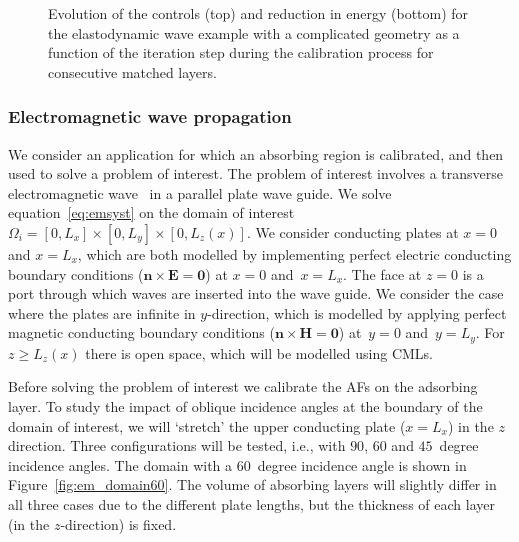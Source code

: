 \documentclass[a4paper]{article}
\renewcommand{\vec}{\boldsymbol}
\begin{document}
\begin{figure}
\begin{minipage}{0.45\textwidth}
   \end{minipage}
  \caption{Evolution of the controls (top) and reduction in energy
    (bottom) for the elastodynamic wave example with a complicated
    geometry as a function of the iteration step during the
    calibration process for consecutive matched layers.}
  \label{fig:arb_history}
\end{figure}

\subsubsection{Electromagnetic wave propagation}
\label{sec:em}

We consider an application for which an absorbing region is
calibrated, and then used to solve a problem of interest.
The problem of interest involves a transverse electromagnetic
wave~\citep{jackson98} in a parallel plate wave guide. We solve
equation~\eqref{eq:emsyst} on the domain of interest~$\Omega_i = [0,
  L_{x}] \times [0, L_{y}] \times [0, L_{z}(x)]$. We consider
conducting plates at $x = 0$ and $x = L_x$, which are both modelled by
implementing perfect electric conducting boundary conditions
($\vec{n}\times \vec{E} = \vec{0}$) at $x = 0$ and~$x = L_x$.  The face at
$z = 0$ is a port through which waves are inserted into the wave
guide.  We consider the case where the plates are infinite in
$y$-direction, which is modelled by applying perfect magnetic
conducting boundary conditions ($\vec{n}\times \vec{H} = \vec{0}$) at~$y =
0$ and~$y = L_y$.  For $z \geq L_{z}(x)$ there is open space, which
will be modelled using CMLs.

Before solving the problem of interest we calibrate the AFs on
the adsorbing layer. To study the impact of oblique incidence angles
at the boundary of the domain of interest, we
will `stretch' the upper conducting plate ($x = L_{x}$) in the $z$
direction. Three configurations will be tested, i.e., with $90$, $60$
and $45$~degree incidence angles. The domain with a $60$~degree
incidence angle is shown in Figure~\ref{fig:em_domain60}. The volume
of absorbing layers will slightly differ in all three cases due to the
different plate lengths, but the thickness of each layer (in the
$z$-direction) is fixed.
\end{document}
